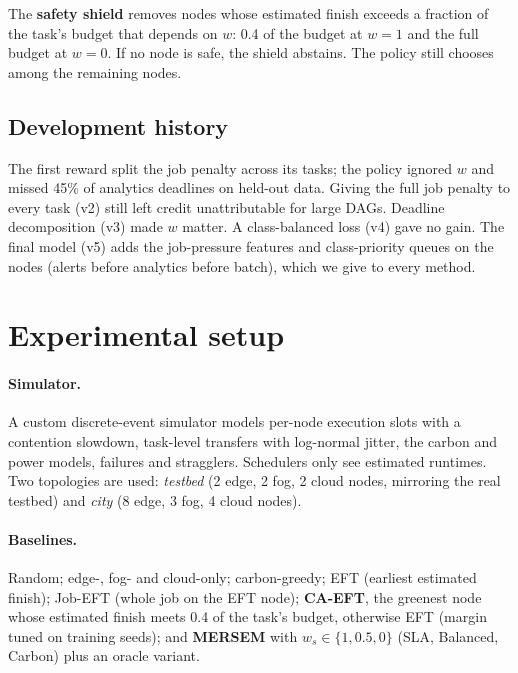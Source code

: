 \documentclass[11pt,a4paper]{article}
\begin{document}
The \textbf{safety shield} removes nodes whose estimated finish exceeds a fraction of the task's budget that depends on $w$: 0.4 of the budget at $w=1$ and the full budget at $w=0$. If no node is safe, the shield abstains. The policy still chooses among the remaining nodes.

\subsection{Development history}\label{sec:history}
The first reward split the job penalty across its tasks; the policy ignored $w$ and missed 45\% of analytics deadlines on held-out data. Giving the full job penalty to every task (v2) still left credit unattributable for large DAGs. Deadline decomposition (v3) made $w$ matter. A class-balanced loss (v4) gave no gain. The final model (v5) adds the job-pressure features and class-priority queues on the nodes (alerts before analytics before batch), which we give to every method.

\section{Experimental setup}\label{sec:setup}

\paragraph{Simulator.} A custom discrete-event simulator models per-node execution slots with a contention slowdown, task-level transfers with log-normal jitter, the carbon and power models, failures and stragglers. Schedulers only see estimated runtimes. Two topologies are used: \emph{testbed} (2 edge, 2 fog, 2 cloud nodes, mirroring the real testbed) and \emph{city} (8 edge, 3 fog, 4 cloud nodes).

\paragraph{Baselines.} Random; edge-, fog- and cloud-only; carbon-greedy; EFT (earliest estimated finish); Job-EFT (whole job on the EFT node); \textbf{CA-EFT}, the greenest node whose estimated finish meets 0.4 of the task's budget, otherwise EFT (margin tuned on training seeds); and \textbf{MERSEM} with $w_s\in\{1,0.5,0\}$ (SLA, Balanced, Carbon) plus an oracle variant.
\end{document}

